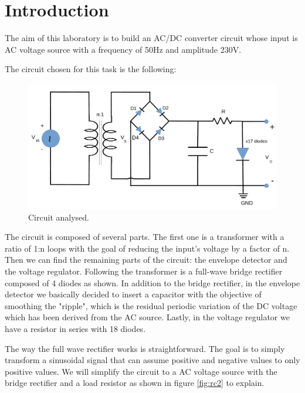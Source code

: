 \section{Introduction}
\label{sec:introduction}
The aim of this laboratory is to build an AC/DC converter
circuit whose input is AC voltage source with a frequency of 50Hz
and amplitude 230V.

The circuit chosen for this task is the following:

\begin{figure}[h] \centering
    \includegraphics[scale=0.4]{lab3.pdf}
    \caption{Circuit analysed.}
    \label{fig:rc}
\end{figure}

The circuit is composed of several parts. The first one is a
transformer with a ratio of 1:n loops with the goal
of reducing the input's voltage by a factor of n.
Then we can find the remaining parts of the circuit: the envelope detector
and the voltage regulator.
Following the transformer is a full-wave bridge rectifier
composed of 4 diodes as shown.
In addition to the bridge rectifier, in the envelope detector we basically decided to insert a
capacitor with the objective of smoothing the "ripple", which is the residual
periodic variation of the DC voltage which has been derived from the AC source.
Lastly, in the voltage regulator we have a resistor in series with 18 diodes.


The way the full wave rectifier works is straightforward. The goal is to
simply transform a sinusoidal signal that can assume positive and negative values to only positive values.
We will simplify the circuit to a AC voltage source with the bridge rectifier and a load resistor as shown in figure \ref{fig:rc2} to explain.

